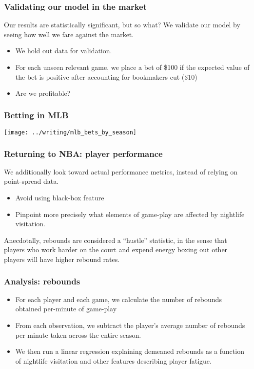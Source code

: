 \documentclass{beamer}
\begin{document}
\begin{frame}   \frametitle{Validating our model in the market}
  Our results are statistically significant, but so what? We validate our model by seeing
  how well we fare against the market.

  \begin{itemize}     \item We hold out data for validation.
    \item For each unseen relevant game, we place a bet of \$100 if the expected value of the bet
      is positive after accounting for bookmakers cut (\$10)
    \item Are we profitable?
  \end{itemize} \end{frame}

\begin{frame}   \frametitle{Betting in MLB}
  \centering
  \texttt{[image: ../writing/mlb\_bets\_by\_season]} \end{frame}

\begin{frame}   \frametitle{Returning to NBA: player performance}
  We additionally look toward actual performance metrics, instead of relying on point-spread data.
  
  \vspace{12pt}
  \begin{itemize}     
    \item Avoid using black-box feature
    \item Pinpoint more precisely what elements of game-play are affected by nightlife visitation.   
\end{itemize}

\vspace{12pt}  Anecdotally, rebounds are considered a ``hustle'' statistic, in the sense that players
  who work harder on the court and expend energy boxing out other players will have higher
  rebound rates. \end{frame}

\begin{frame}   \frametitle{Analysis: rebounds}
  \begin{itemize}     \item For each player and each game, we calculate the number of rebounds obtained per-minute of game-play
    \item From each observation, we subtract the player's average number of rebounds per minute taken across the entire season.
    \item We then run a linear regression explaining demeaned rebounds as a function of 
      nightlife visitation and other features describing player fatigue.   \end{itemize} \end{frame}
\end{document}
